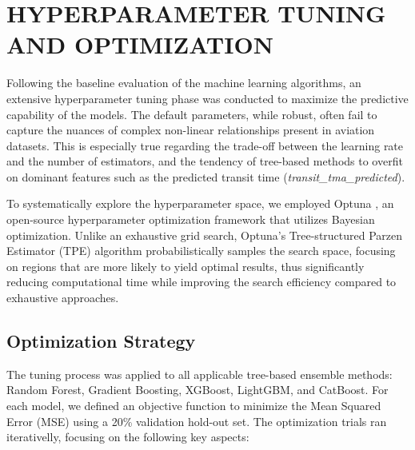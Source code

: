 \section{HYPERPARAMETER TUNING AND OPTIMIZATION}
\label{sec:hyperparameter_tuning}

Following the baseline evaluation of the machine learning algorithms, an extensive hyperparameter tuning phase was conducted to maximize the predictive capability of the models. The default parameters, while robust, often fail to capture the nuances of complex non-linear relationships present in aviation datasets. This is especially true regarding the trade-off between the learning rate and the number of estimators, and the tendency of tree-based methods to overfit on dominant features such as the predicted transit time (\textit{transit\_tma\_predicted}).

To systematically explore the hyperparameter space, we employed Optuna \cite{akiba2019optuna}, an open-source hyperparameter optimization framework that utilizes Bayesian optimization. Unlike an exhaustive grid search, Optuna's Tree-structured Parzen Estimator (TPE) algorithm probabilistically samples the search space, focusing on regions that are more likely to yield optimal results, thus significantly reducing computational time while improving the search efficiency compared to exhaustive approaches.

\subsection{Optimization Strategy}

The tuning process was applied to all applicable tree-based ensemble methods: Random Forest, Gradient Boosting, XGBoost, LightGBM, and CatBoost. For each model, we defined an objective function to minimize the Mean Squared Error (MSE) using a 20\% validation hold-out set. The optimization trials ran iterativelly, focusing on the following key aspects:

